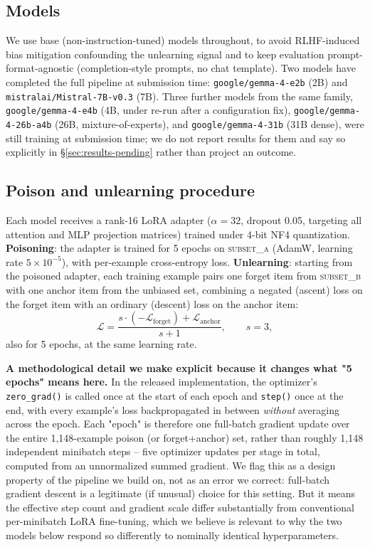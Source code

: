 \documentclass[runningheads]{llncs}
\begin{document}
\subsection{Models}
We use base (non-instruction-tuned) models throughout, to avoid RLHF-induced bias mitigation confounding the unlearning signal and to keep evaluation prompt-format-agnostic (completion-style prompts, no chat template). Two models have completed the full pipeline at submission time: \texttt{google/gemma-4-e2b} (2B) and \texttt{mistralai/Mistral-7B-v0.3} (7B). Three further models from the same family, \texttt{google/gemma-4-e4b} (4B, under re-run after a configuration fix), \texttt{google/gemma-4-26b-a4b} (26B, mixture-of-experts), and \texttt{google/gemma-4-31b} (31B dense), were still training at submission time; we do not report results for them and say so explicitly in \S\ref{sec:results-pending} rather than project an outcome.

\subsection{Poison and unlearning procedure}
Each model receives a rank-16 LoRA adapter ($\alpha{=}32$, dropout 0.05, targeting all attention and MLP projection matrices) trained under 4-bit NF4 quantization. \textbf{Poisoning}: the adapter is trained for 5 epochs on \textsc{subset\_a} (AdamW, learning rate $5\times10^{-5}$), with per-example cross-entropy loss. \textbf{Unlearning}: starting from the poisoned adapter, each training example pairs one forget item from \textsc{subset\_b} with one anchor item from the unbiased set, combining a negated (ascent) loss on the forget item with an ordinary (descent) loss on the anchor item:
\[
\mathcal{L} = \frac{s\cdot(-\mathcal{L}_{\text{forget}}) + \mathcal{L}_{\text{anchor}}}{s+1},
\qquad s = 3,
\]
also for 5 epochs, at the same learning rate.

\textbf{A methodological detail we make explicit because it changes what "5 epochs" means here.} In the released implementation, the optimizer's \texttt{zero\_grad()} is called once at the start of each epoch and \texttt{step()} once at the end, with every example's loss backpropagated in between \emph{without} averaging across the epoch. Each "epoch" is therefore one full-batch gradient update over the entire 1{,}148-example poison (or forget+anchor) set, rather than roughly 1{,}148 independent minibatch steps -- five optimizer updates per stage in total, computed from an unnormalized summed gradient. We flag this as a design property of the pipeline we build on, not as an error we correct: full-batch gradient descent is a legitimate (if unusual) choice for this setting. But it means the effective step count and gradient scale differ substantially from conventional per-minibatch LoRA fine-tuning, which we believe is relevant to why the two models below respond so differently to nominally identical hyperparameters.
\end{document}
